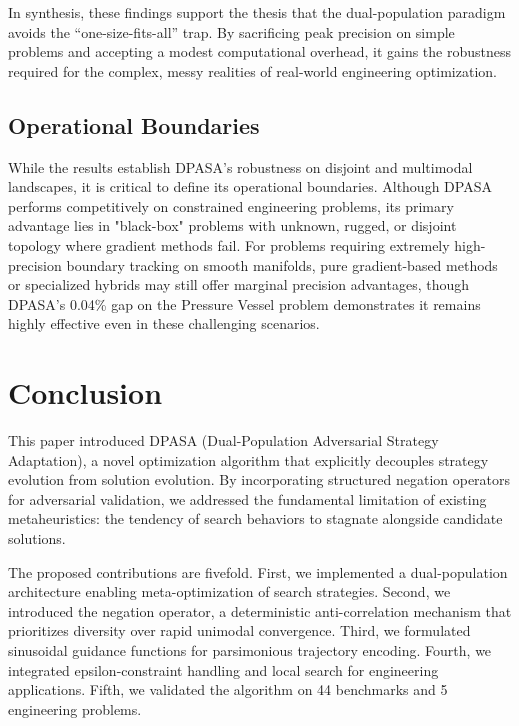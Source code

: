 \documentclass[11pt]{article}
\begin{document}
In synthesis, these findings support the thesis that the dual-population paradigm avoids the ``one-size-fits-all'' trap. By sacrificing peak precision on simple problems and accepting a modest computational overhead, it gains the robustness required for the complex, messy realities of real-world engineering optimization.


\subsection{Operational Boundaries}
\label{sec:limitations}
While the results establish DPASA's robustness on disjoint and multimodal landscapes, it is critical to define its operational boundaries. Although DPASA performs competitively on constrained engineering problems, its primary advantage lies in "black-box" problems with unknown, rugged, or disjoint topology where gradient methods fail. For problems requiring extremely high-precision boundary tracking on smooth manifolds, pure gradient-based methods or specialized hybrids may still offer marginal precision advantages, though DPASA's 0.04\% gap on the Pressure Vessel problem demonstrates it remains highly effective even in these challenging scenarios.

\section{Conclusion}
\label{sec:conclusion}

This paper introduced DPASA (Dual-Population Adversarial Strategy Adaptation), a novel optimization algorithm that explicitly decouples strategy evolution from solution evolution. By incorporating structured negation operators for adversarial validation, we addressed the fundamental limitation of existing metaheuristics: the tendency of search behaviors to stagnate alongside candidate solutions.

The proposed contributions are fivefold. First, we implemented a dual-population architecture enabling meta-optimization of search strategies. Second, we introduced the negation operator, a deterministic anti-correlation mechanism that prioritizes diversity over rapid unimodal convergence. Third, we formulated sinusoidal guidance functions for parsimonious trajectory encoding. Fourth, we integrated epsilon-constraint handling and local search for engineering applications. Fifth, we validated the algorithm on 44 benchmarks and 5 engineering problems.
\end{document}
